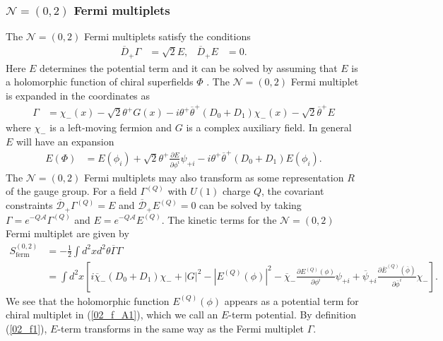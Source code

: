 \documentclass{article}
\numberwithin{equation}{section}
\begin{document}
\subsubsection{$\mathcal{N}=(0,2)$ Fermi multiplets}
The $\mathcal{N}=(0,2)$ Fermi multiplets satisfy the conditions 
\begin{align}
\label{02_f1}
\overline{D}_{+}\Gamma&=\sqrt{2}E,& \overline{D}_{+}E&=0. 
\end{align}
Here $E$ determines the potential term and 
it can be solved by assuming that $E$ is a holomorphic function of chiral superfields $\Phi$ \cite{Witten:1993yc}.  
The $\mathcal{N}=(0,2)$ Fermi multiplet is expanded in the coordinates as
\begin{align}
\label{02_f2}
\Gamma&=\chi_{-}(x)-\sqrt{2}\theta^{+}G(x)-i\theta^{+}\overline{\theta}^{+}(D_{0}+D_{1})\chi_{-}(x)-\sqrt{2}\overline{\theta}^{+}E
\end{align}
where $\chi_{-}$ is a left-moving fermion and $G$ is a complex auxiliary field. 
In general $E$ will have an expansion 
\begin{align}
\label{02_f3}
E(\Phi)&=E(\phi_{i})+\sqrt{2}\theta^{+}\frac{\partial E}{\partial \phi^{i}}\psi_{+i}-i\theta^{+}\overline{\theta}^{+}(D_{0}+D_{1})E(\phi_{i}). 
\end{align}
The $\mathcal{N}=(0,2)$ Fermi multiplets may also transform as some representation $R$ of the gauge group. 
For a field $\Gamma^{(Q)}$ with $U(1)$ charge $Q$, 
the covariant constraints $\overline{\mathcal{D}}_{+}\Gamma^{(Q)}=E$ and $\overline{\mathcal{D}}_{+}E^{(Q)}=0$ can be solved 
by taking $\Gamma=e^{-Q\mathcal{A}}\Gamma^{(Q)}$ and $E=e^{-Q\mathcal{A}}E^{(Q)}$. 
The kinetic terms for the $\mathcal{N}=(0,2)$ Fermi multiplet are given by 
\begin{align}
\label{02_f_A1}
S_{\mathrm{ferm}}^{(0,2)}
&=-\frac12 \int d^{2}x d^{2}\theta \overline{\Gamma}\Gamma\nonumber\\
&=\int d^{2}x
\left[ i\overline{\chi}_{-}(D_{0}+D_{1})\chi_{-}+|G|^{2}-|E^{(Q)}(\phi)|^{2}-\overline{\chi}_{-}\frac{\partial E^{(Q)}(\phi)}{\partial \phi^{i}}\psi_{+i}
+\overline{\psi}_{+i}\frac{\partial \overline{E}^{(Q)}(\overline{\phi})}{\partial \overline{\phi}^{i}}\chi_{-}
\right]. 
\end{align}
We see that the holomorphic function $E^{(Q)}(\phi)$ appears as a potential term for chiral multiplet in (\ref{02_f_A1}), 
which we call an $E$-term potential. 
By definition (\ref{02_f1}),  
$E$-term transforms in the same way as the Fermi multiplet $\Gamma$. 
\end{document}
